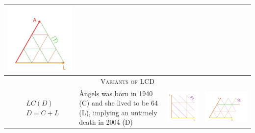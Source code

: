 \documentclass[12pt,oneside,a4paper]{article} %
\begin{document}
\begin{longtable}{m{}m{}m{}m{}}
  \includegraphics[scale=.5]{Figures/DiagramTable/AL_iso.pdf}  \\
  \midrule
  \multicolumn{4}{c}{\textsc{Variants of LCD}} \\
  \midrule
  $$\begin{aligned}
    &LC(D) \\
    &D = C + L
  \end{aligned}$$ &
  \`{A}ngels was born in 1940 (C) and she lived to be 64 (L), implying an
  untimely death in 2004 (D) &
  \includegraphics[scale=.5]{Figures/DiagramTable/LC_rt.pdf} &
  \includegraphics[scale=.5]{Figures/DiagramTable/LC_iso.pdf}  \\

\end{longtable}
\end{document}
